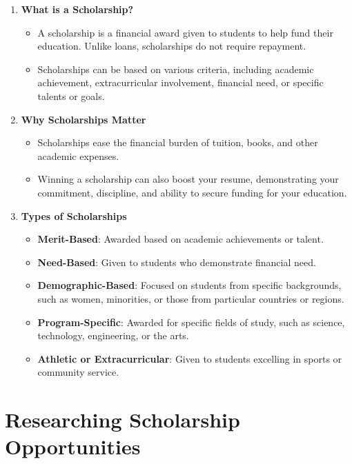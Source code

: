 \documentclass[
  letterpaper,
  DIV=11,
  numbers=noendperiod]{scrreprt}
\providecommand{\tightlist}{%
  \setlength{\itemsep}{0pt}\setlength{\parskip}{0pt}}\usepackage{longtable,booktabs,array}
\begin{document}
\begin{enumerate}
\def\labelenumi{\arabic{enumi}.}
\item
  \textbf{What is a Scholarship?}

  \begin{itemize}
  \tightlist
  \item
    A scholarship is a financial award given to students to help fund
    their education. Unlike loans, scholarships do not require
    repayment.
  \item
    Scholarships can be based on various criteria, including academic
    achievement, extracurricular involvement, financial need, or
    specific talents or goals.
  \end{itemize}
\item
  \textbf{Why Scholarships Matter}

  \begin{itemize}
  \tightlist
  \item
    Scholarships ease the financial burden of tuition, books, and other
    academic expenses.
  \item
    Winning a scholarship can also boost your resume, demonstrating your
    commitment, discipline, and ability to secure funding for your
    education.
  \end{itemize}
\item
  \textbf{Types of Scholarships}

  \begin{itemize}
  \tightlist
  \item
    \textbf{Merit-Based}: Awarded based on academic achievements or
    talent.
  \item
    \textbf{Need-Based}: Given to students who demonstrate financial
    need.
  \item
    \textbf{Demographic-Based}: Focused on students from specific
    backgrounds, such as women, minorities, or those from particular
    countries or regions.
  \item
    \textbf{Program-Specific}: Awarded for specific fields of study,
    such as science, technology, engineering, or the arts.
  \item
    \textbf{Athletic or Extracurricular}: Given to students excelling in
    sports or community service.
  \end{itemize}
\end{enumerate}

\section{Researching Scholarship
Opportunities}\label{researching-scholarship-opportunities}
\end{document}
